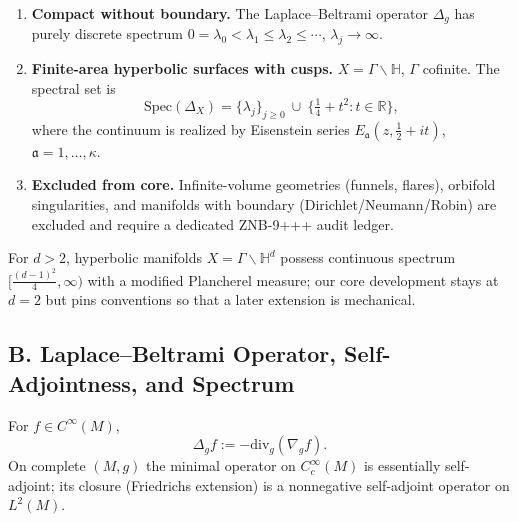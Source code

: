 \begin{definition}
\label{def:core-classes-part1}
\begin{enumerate}[label=(\roman*)]
  \item \textbf{Compact without boundary.} The Laplace--Beltrami operator $\Delta_g$ has purely discrete spectrum $0=\lambda_0<\lambda_1\le\lambda_2\le\cdots$, $\lambda_j\to\infty$.
  \item \textbf{Finite-area hyperbolic surfaces with cusps.} $X=\Gamma\backslash\mathbb H$, $\Gamma$ cofinite. The spectral set is
  \[
    \mathrm{Spec}(\Delta_X)=\{\lambda_j\}_{j\ge 0}\ \cup\ \{\tfrac14+t^2: t\in\mathbb R\},
  \]
  where the continuum is realized by Eisenstein series $E_{\mathfrak a}(z,\tfrac12+it)$, $\mathfrak a=1,\dots,\kappa$.
  \item \textbf{Excluded from core.} Infinite-volume geometries (funnels, flares), orbifold singularities, and manifolds with boundary (Dirichlet/Neumann/Robin) are excluded and require a dedicated ZNB-9+++ audit ledger.
\end{enumerate}
\end{definition}

\begin{remark}
\label{rem:higher-dim-record}
For $d>2$, hyperbolic manifolds $X=\Gamma\backslash\mathbb H^d$ possess continuous spectrum $[\tfrac{(d-1)^2}{4},\infty)$ with a modified Plancherel measure; our core development stays at $d=2$ but pins conventions so that a later extension is mechanical.
\end{remark}


\subsection*{B. Laplace–Beltrami Operator, Self-Adjointness, and Spectrum}
\label{subsec:laplacian-sharp-patched-20-10}

\begin{definition}
\label{def:laplacian-friedrichs-part1}
For $f\in C^\infty(M)$,
\[
  \Delta_g f := -\mathrm{div}_g(\nabla_g f).
\]
On complete $(M,g)$ the minimal operator on $C_c^\infty(M)$ is essentially self-adjoint; its closure (Friedrichs extension) is a nonnegative self-adjoint operator on $L^2(M)$.
\end{definition}

